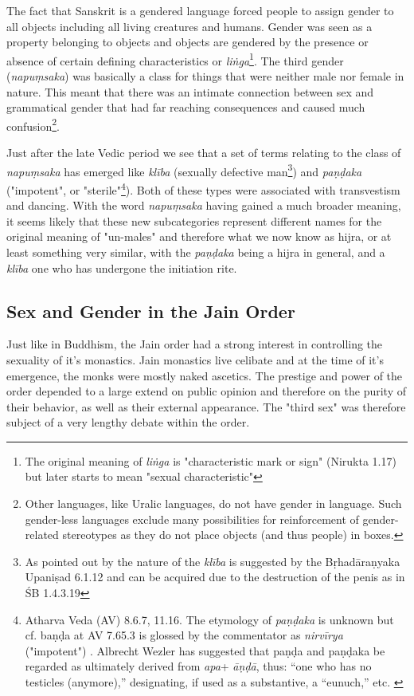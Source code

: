 The fact that Sanskrit is a gendered language forced people to assign gender to all objects including all living creatures and humans. Gender was seen as a property belonging to objects and objects are gendered by the presence or absence of certain defining characteristics or {\em liṅga}\footnote{The original meaning of {\em liṅga} is "characteristic mark or sign" (Nirukta 1.17) but later starts to mean "sexual characteristic"}. The third gender ({\em napuṃsaka}) was basically a class for things that were neither male nor female in nature. This meant that there was an intimate connection between sex and grammatical gender that had far reaching consequences and caused much confusion\footnote{Other languages, like Uralic languages, do not have gender in language. Such gender-less languages exclude many possibilities for reinforcement of gender-related stereotypes as they do not place objects (and thus people) in boxes.}. 

Just after the late Vedic period we see that a set of terms relating to the class of {\em napuṃsaka} has emerged like {\em klība} (sexually defective man\footnote{As pointed out by \cite{zwilling} the nature of the {\em klība} is suggested by the Bṛhadāraṇyaka Upaniṣad 6.1.12 and can be acquired due to the destruction of the penis as in ŚB 1.4.3.19}) and {\em paṇḍaka} ("impotent", or "sterile"\footnote{Atharva Veda (AV) 8.6.7, 11.16. The etymology of {\em paṇḍaka} is unknown but cf. baṇḍa at AV 7.65.3 is glossed by the commentator as {\em nirvīrya} ("impotent") \cite{zwilling}. Albrecht Wezler has suggested that paṇḍa and paṇḍaka be regarded as ultimately derived from {\em *apa}+ {\em āṇḍā}, thus: “one who has no testicles (anymore),” designating, if used as a substantive, a “eunuch,” etc. \cite{wezler}}). Both of these types were associated with transvestism and dancing. With the word {\em napuṃsaka} having gained a much broader meaning, it seems likely that these new subcategories represent different names for the original meaning of "un-males" and therefore what we now know as hijra, or at least something very similar, with the {\em paṇḍaka} being a hijra in general, and a {\em klība} one who has undergone the initiation rite.


\subsection{Sex and Gender in the Jain Order}
Just like in Buddhism, the Jain order had a strong interest in controlling the sexuality of it's monastics. Jain monastics live celibate and at the time of it's emergence, the monks were mostly naked ascetics. The prestige and power of the order depended to a large extend on public opinion and therefore on the purity of their behavior, as well as their external appearance. The "third sex" was therefore subject of a very lengthy debate within the order. 

